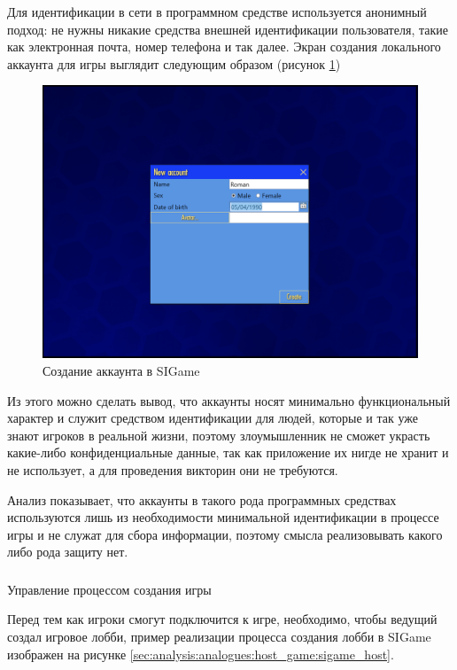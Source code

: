Для идентификации в сети в программном средстве используется анонимный подход: не нужны никакие средства внешней идентификации пользователя, такие как электронная почта,
номер телефона и так далее. Экран создания локального аккаунта для игры выглядит следующим образом (рисунок \ref{sec:analysis:analogues:create_acc:sigame_acc})

\begin{figure}[!ht]
	\centering
	\includegraphics[scale=0.5]{attachments/sigame_acc.png}  
	\caption{Создание аккаунта в SIGame}
	\label{sec:analysis:analogues:create_acc:sigame_acc}
\end{figure}

Из этого можно сделать вывод, что аккаунты носят минимально функциональный характер и служит средством идентификации для
людей, которые и так уже знают игроков в реальной жизни, поэтому злоумышленник не сможет украсть какие-либо конфиденциальные данные,
так как приложение их нигде не хранит и не использует, а для проведения викторин они не требуются. 

Анализ показывает, что аккаунты в такого рода программных средствах используются лишь из необходимости минимальной идентификации в процессе игры и не служат для
сбора информации, поэтому смысла реализовывать какого либо рода защиту нет.

\subsubsection{} Управление процессом создания игры
\label{sec:analysis:analogues:host_game}

Перед тем как игроки смогут подключится к игре, необходимо, чтобы ведущий создал игровое лобби, пример реализации процесса создания лобби в SIGame изображен на 
рисунке \ref{sec:analysis:analogues:host_game:sigame_host}. 

